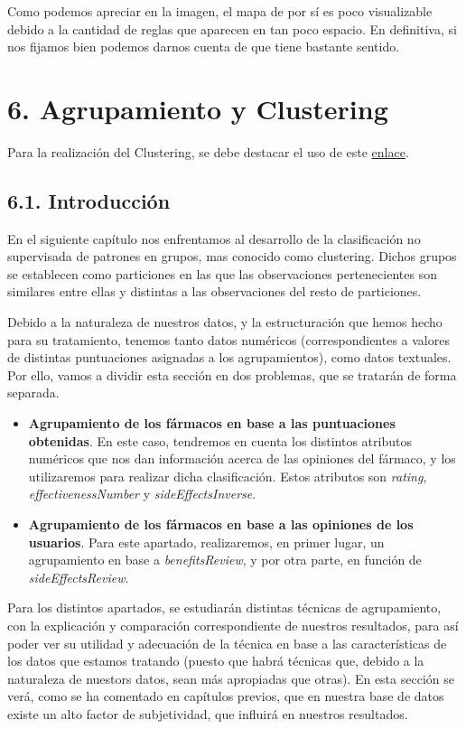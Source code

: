 \documentclass[spanish,]{article}
\begin{document}
Como podemos apreciar en la imagen, el mapa de por sí es poco
visualizable debido a la cantidad de reglas que aparecen en tan poco
espacio. En definitiva, si nos fijamos bien podemos darnos cuenta de que
tiene bastante sentido.

\newpage

\section{6. Agrupamiento y Clustering}\label{agrupamiento-y-clustering}

Para la realización del Clustering, se debe destacar el uso de este
\href{https://rpubs.com/Joaquin_AR/310338}{enlace}.

\subsection{6.1. Introducción}\label{introduccion}

En el siguiente capítulo nos enfrentamos al desarrollo de la
clasificación no supervisada de patrones en grupos, mas conocido como
clustering. Dichos grupos se establecen como particiones en las que las
observaciones pertenecientes son similares entre ellas y distintas a las
observaciones del resto de particiones.

Debido a la naturaleza de nuestros datos, y la estructuración que hemos
hecho para su tratamiento, tenemos tanto datos numéricos
(correspondientes a valores de distintas puntuaciones asignadas a los
agrupamientos), como datos textuales. Por ello, vamos a dividir esta
sección en dos problemas, que se tratarán de forma separada.

\begin{itemize}
\item
  \textbf{Agrupamiento de los fármacos en base a las puntuaciones obtenidas}.
  En este caso, tendremos en cuenta los distintos atributos numéricos
  que nos dan información acerca de las opiniones del fármaco, y los
  utilizaremos para realizar dicha clasificación. Estos atributos son
  \emph{rating}, \emph{effectivenessNumber} y \emph{sideEffectsInverse}.
\item
  \textbf{Agrupamiento de los fármacos en base a las opiniones de los usuarios}.
  Para este apartado, realizaremos, en primer lugar, un agrupamiento en
  base a \emph{benefitsReview}, y por otra parte, en función de
  \emph{sideEffectsReview}.
\end{itemize}

Para los distintos apartados, se estudiarán distintas técnicas de
agrupamiento, con la explicación y comparación correspondiente de
nuestros resultados, para así poder ver su utilidad y adecuación de la
técnica en base a las características de los datos que estamos tratando
(puesto que habrá técnicas que, debido a la naturaleza de nuestors
datos, sean más apropiadas que otras). En esta sección se verá, como se
ha comentado en capítulos previos, que en nuestra base de datos existe
un alto factor de subjetividad, que influirá en nuestros resultados.
\end{document}
